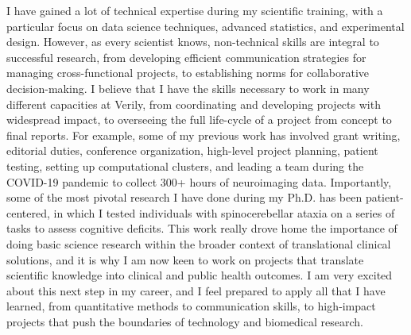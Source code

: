 \documentclass[9pt, a4paper]{maedbh-cv}
\begin{document}
\begin{cvletter}
I have gained a lot of technical expertise during my scientific training, with a particular focus on data science techniques, advanced statistics, and experimental design. However, as every scientist knows, non-technical skills are integral to successful research, from developing efficient communication strategies for managing cross-functional projects, to establishing norms for collaborative decision-making. I believe that I have the skills necessary to work in many different capacities at Verily, from coordinating and developing projects with widespread impact, to overseeing the full life-cycle of a project from concept to final reports. For example, some of my previous work has involved grant writing, editorial duties, conference organization, high-level project planning, patient testing, setting up computational clusters, and leading a team during the COVID-19 pandemic to collect 300+ hours of neuroimaging data. Importantly, some of the most pivotal research I have done during my Ph.D. has been patient-centered, in which I tested individuals with spinocerebellar ataxia on a series of tasks to assess cognitive deficits. This work really drove home the importance of doing basic science research within the broader context of translational clinical solutions, and it is why I am now keen to work on projects that translate scientific knowledge into clinical and public health outcomes. I am very excited about this next step in my career, and I feel prepared to apply all that I have learned, from quantitative methods to communication skills, to high‐impact projects that push the boundaries of technology and biomedical research. 
 

\end{cvletter}

\makeletterclosing
\end{document}
